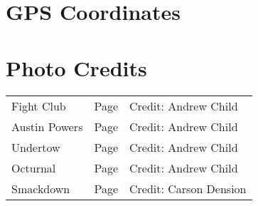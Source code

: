 \section{GPS Coordinates}
\section{Photo Credits}
\begin{supertabular}{lll}
Fight Club&Page \pageref{pt:Fight Club}&Credit: Andrew Child\\
Austin Powers&Page \pageref{pt:Austin Powers}&Credit: Andrew Child\\
Undertow&Page \pageref{pt:Undertow}&Credit: Andrew Child\\
Octurnal&Page \pageref{pt:Octurnal}&Credit: Andrew Child\\
Smackdown&Page \pageref{pt:Smackdown}&Credit: Carson Dension\\
\end{supertabular}

\clearpage